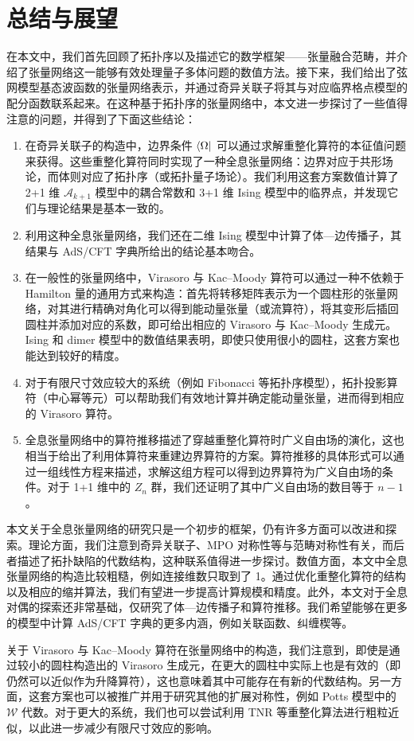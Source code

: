 \chapter{总结与展望}
\label{chap:conclusion}

在本文中，我们首先回顾了拓扑序以及描述它的数学框架——张量融合范畴，并介绍了张量网络这一能够有效处理量子多体问题的数值方法。接下来，我们给出了弦网模型基态波函数的张量网络表示，并通过奇异关联子将其与对应临界格点模型的配分函数联系起来。在这种基于拓扑序的张量网络中，本文进一步探讨了一些值得注意的问题，并得到了下面这些结论：

\begin{enumerate}
  \item 在奇异关联子的构造中，边界条件 $\bra{\Omega}$ 可以通过求解重整化算符的本征值问题来获得。这些重整化算符同时实现了一种全息张量网络：边界对应于共形场论，而体则对应了拓扑序（或拓扑量子场论）。我们利用这套方案数值计算了 2+1 维 $\mathcal{A}_{k+1}$ 模型中的耦合常数和 3+1 维 Ising 模型中的临界点，并发现它们与理论结果是基本一致的。
  \item 利用这种全息张量网络，我们还在二维 Ising 模型中计算了体—边传播子，其结果与 AdS/CFT 字典所给出的结论基本吻合。
  \item 在一般性的张量网络中，Virasoro 与 Kac--Moody 算符可以通过一种不依赖于 Hamilton 量的通用方式来构造：首先将转移矩阵表示为一个圆柱形的张量网络，对其进行精确对角化可以得到能动量张量（或流算符），将其变形后插回圆柱并添加对应的系数，即可给出相应的 Virasoro 与 Kac--Moody 生成元。Ising 和 dimer 模型中的数值结果表明，即使只使用很小的圆柱，这套方案也能达到较好的精度。
  \item 对于有限尺寸效应较大的系统（例如 Fibonacci 等拓扑序模型），拓扑投影算符（中心幂等元）可以帮助我们有效地计算并确定能动量张量，进而得到相应的 Virasoro 算符。
  \item 全息张量网络中的算符推移描述了穿越重整化算符时广义自由场的演化，这也相当于给出了利用体算符来重建边界算符的方案。算符推移的具体形式可以通过一组线性方程来描述，求解这组方程可以得到边界算符为广义自由场的条件。对于 1+1 维中的 $Z_n$ 群，我们还证明了其中广义自由场的数目等于 $n-1$。
\end{enumerate}

本文关于全息张量网络的研究只是一个初步的框架，仍有许多方面可以改进和探索。理论方面，我们注意到奇异关联子、MPO 对称性等与范畴对称性\cite{ji2020categorical,kong2020algebraic,wu2021categorical,lootens2023dualities}\allowbreak 有关，而后者描述了拓扑缺陷的代数结构，这种联系值得进一步探讨。数值方面，本文中全息张量网络的构造比较粗糙，例如连接维数只取到了 1。通过优化重整化算符的结构以及相应的缩并算法，我们有望进一步提高计算规模和精度。此外，本文对于全息对偶的探索还非常基础，仅研究了体—边传播子和算符推移。我们希望能够在更多的模型中计算 AdS/CFT 字典的更多内涵，例如关联函数、纠缠楔等。

关于 Virasoro 与 Kac--Moody 算符在张量网络中的构造，我们注意到，即使是通过较小的圆柱构造出的 Virasoro 生成元，在更大的圆柱中实际上也是有效的（即仍然可以近似作为升降算符），这也意味着其中可能存在有新的代数结构。另一方面，这套方案也可以被推广并用于研究其他的扩展对称性，例如 Potts 模型中的 $\mathcal{W}$ 代数\cite{fateev1987conformal}。对于更大的系统，我们也可以尝试利用 TNR 等重整化算法进行粗粒近似，以此进一步减少有限尺寸效应的影响。
